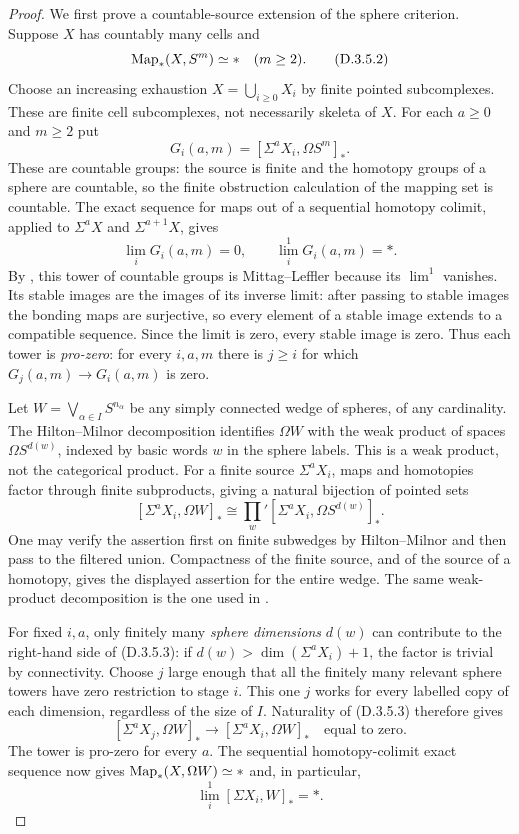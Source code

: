 \begin{proof}
We first prove a countable-source extension of the sphere
criterion. Suppose $X$ has countably many cells and
\[
             \operatorname{Map}_*(X,S^m)\simeq *\quad(m\geq2).
 \tag{D.3.5.2}
\]
Choose an increasing exhaustion $X=\bigcup_{i\geq0}X_i$
by finite pointed subcomplexes. These are finite cell
subcomplexes, not necessarily skeleta of $X$.
For each $a\geq0$ and $m\geq2$ put
\[
       G_i(a,m)=[\Sigma^aX_i,\Omega S^m]_*.
\]
These are countable groups: the source is finite and the
homotopy groups of a sphere are countable, so the finite
obstruction calculation of the mapping set is countable.
The exact sequence for maps out of a sequential homotopy
colimit, applied to $\Sigma^aX$ and $\Sigma^{a+1}X$, gives
\[
       \lim_iG_i(a,m)=0,\qquad
       \lim_i^1G_i(a,m)=*.
\]
By \cite[Proposition~4(b)]{I_Strom2012}, this tower of
countable groups is Mittag--Leffler because its $\lim^1$ vanishes.
Its stable images are the images of its inverse limit:
after passing to stable images the bonding maps are
surjective, so every element of a stable image extends to a
compatible sequence. Since the limit is zero, every stable
image is zero. Thus each tower is \emph{pro-zero}:
for every $i,a,m$ there is $j\geq i$ for which
$G_j(a,m)\to G_i(a,m)$ is zero.

Let $W=\bigvee_{\alpha\in I}S^{n_\alpha}$ be any simply
connected wedge of spheres, of any cardinality. The
Hilton--Milnor decomposition identifies $\Omega W$ with
the weak product of spaces $\Omega S^{d(w)}$, indexed by
basic words $w$ in the sphere labels. This is a weak
product, not the categorical product. For a finite source
$\Sigma^aX_i$, maps and homotopies factor through finite
subproducts, giving a natural bijection of pointed sets
\[
 [\Sigma^aX_i,\Omega W]_*
   \cong\prod_w' [\Sigma^aX_i,\Omega S^{d(w)}]_*.
 \tag{D.3.5.3}
\]
One may verify the assertion first on finite subwedges by
Hilton--Milnor and then pass to the filtered union. Compactness
of the finite source, and of the source of a homotopy, gives
the displayed assertion for the entire wedge. The same
weak-product decomposition is the one used in
\cite[proof of Proposition~6]{I_Strom2012}.

For fixed $i,a$, only finitely many \emph{sphere dimensions}
$d(w)$ can contribute to the right-hand side of
(D.3.5.3): if $d(w)>\dim(\Sigma^aX_i)+1$, the factor is
trivial by connectivity. Choose $j$ large enough that all
the finitely many relevant sphere towers have zero
restriction to stage $i$. This one $j$ works for every
labelled copy of each dimension, regardless of the size of
$I$. Naturality of (D.3.5.3) therefore gives
\[
 [\Sigma^aX_j,\Omega W]_*
       \longrightarrow[\Sigma^aX_i,\Omega W]_*
       \quad\text{equal to zero}.
\]
The tower is pro-zero for every $a$. The sequential
homotopy-colimit exact sequence now gives
$\operatorname{Map}_*(X,\Omega W)\simeq *$ and, in particular,
\[
                \lim_i^1[\Sigma X_i,W]_* = *.
 \tag{D.3.5.4}
\]


\end{proof}
